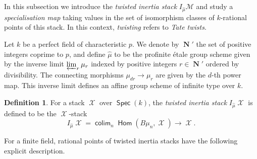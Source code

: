\documentclass{article}
\DeclareMathOperator{\Hom}{\mathsf{Hom}}
\DeclareMathOperator{\hash}{\#}
\DeclareMathOperator{\Nb}{\mathbf{N}}
\DeclareMathOperator{\Xc}{\mathcal{X}}
\DeclareMathOperator{\colim}{\mathsf{colim}}
\newcommand{\Mc}{\mathcal{M}}
\DeclareMathOperator{\Spec}{\mathsf{Spec}}
\DeclareMathOperator{\Oo}{\mathcal{O}}
\theoremstyle{definition}
\newtheorem{definition}{Definition}[section]
\theoremstyle{plain}
\newtheorem{goal}[definition]{Goal}
\begin{document}

In this subsection we introduce the \emph{twisted inertia stack} $I_{\widehat{\mu}}\Mc$ and study a \emph{specialisation map} taking values in the set of isomorphism classes of $k$-rational points of this stack. In this context, \emph{twisting} refers to \emph{Tate twists}.

Let $k$ be a perfect field of characteristic $p$. We denote by $\Nb'$ the set of positive integers coprime to $p$, and define $\widehat{\mu}$ to be the profinite \'etale group scheme given by the inverse limit $\varprojlim_r \mu_r$
indexed by positive integers $r \in \Nb'$ ordered by divisibility. The connecting morphisms $\mu_{dr} \to \mu_r$ are given by the $d$-th power map. This inverse limit defines an affine group scheme of infinite type over $k$.

\begin{definition}\label{defi:twisted_inertia}
For a stack $\Xc$ over $\Spec(k)$, the \emph{twisted inertia stack} $I_{\widehat{\mu}}\Xc$ is defined to be the $\Xc$-stack 
$$I_{\widehat{\mu}}\Xc = \colim_n\Hom(B\mu_n,\Xc) \to \Xc.$$
\end{definition}

For a finite field, rational points of twisted inertia stacks have the following explicit description. 
\end{document}

